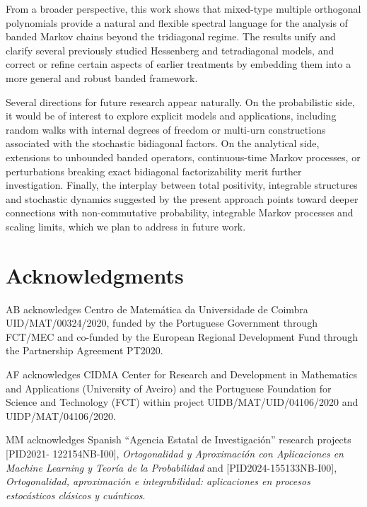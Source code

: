 \documentclass[11pt]{amsart}
\theoremstyle{plain}
\newcommand{\1}{\text{\fontseries{bx}\selectfont \textup 1}}
\begin{document}
From a broader perspective, this work shows that mixed-type multiple orthogonal polynomials provide a natural and flexible spectral language for the analysis of banded Markov chains beyond the tridiagonal regime. The results unify and clarify several previously studied Hessenberg and tetradiagonal models, and correct or refine certain aspects of earlier treatments by embedding them into a more general and robust banded framework.

Several directions for future research appear naturally. On the probabilistic side, it would be of interest to explore explicit models and applications, including random walks with internal degrees of freedom or multi-urn constructions associated with the stochastic bidiagonal factors. On the analytical side, extensions to unbounded banded operators, continuous-time Markov processes, or perturbations breaking exact bidiagonal factorizability merit further investigation. Finally, the interplay between total positivity, integrable structures and stochastic dynamics suggested by the present approach points toward deeper connections with non-commutative probability, integrable Markov processes and scaling limits, which we plan to address in future work.




\section*{Acknowledgments}
AB acknowledges Centro de Matemática da Universidade de Coimbra UID/MAT/00324/2020, funded by the Portuguese Government through FCT/MEC and co-funded by the European Regional Development Fund through the Partnership Agreement PT2020.

AF acknowledges CIDMA Center for Research and Development in Mathematics and Applications (University of Aveiro) and the Portuguese Foundation for Science and Technology (FCT) within project UIDB/MAT/UID/04106/2020 and UIDP/MAT/04106/2020.

MM acknowledges Spanish ``Agencia Estatal de Investigación'' research projects [PID2021- 122154NB-I00], \emph{Ortogonalidad y Aproximación con Aplicaciones en Machine Learning y Teoría de la Probabilidad} and  [PID2024-155133NB-I00],  \emph{Ortogonalidad, aproximación e integrabilidad: aplicaciones en procesos estocásticos clásicos y cuánticos}.


\printbibliography
\end{document}
